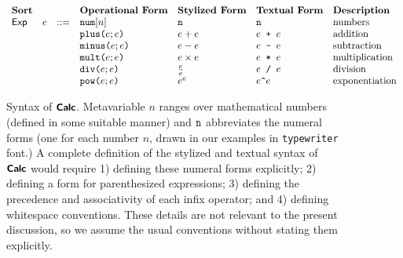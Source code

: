 \begin{figure}
\hspace{-5px}$\begin{array}{lrlllll}
\textbf{Sort} & & & \textbf{Operational Form} & \textbf{Stylized Form} & \textbf{Textual Form} & \textbf{Description}\\
\mathsf{Exp} & e & ::= & \anumintro{n} & \numintro{n} & \numintro{n} & \text{numbers}\\
&&& \aplus{e}{e} & e + e & e\texttt{ + }e & \text{addition} \\
&&& \aminus{e}{e} & e - e & e\texttt{ - }e & \text{subtraction}\\
&&& \amult{e}{e} & e \times e & e\texttt{ * }e & \text{multiplication}\\
&&& \adiv{e}{e} & \frac{e}{e} & e\texttt{ / }e & \text{division}\\
&&& \apow{e}{e} & {e}^{e} & e\verb|^|e & \text{exponentiation}
\end{array}$
\caption[Syntax of $\simplelang$]{Syntax of $\simplelang$. Metavariable $n$ ranges over mathematical numbers (defined in some suitable manner) and $\texttt{n}$ abbreviates the numeral forms (one for each number $n$, drawn in our examples in \texttt{typewriter} font.) A complete definition of the stylized and textual syntax of $\simplelang$ would require 1) defining these numeral forms explicitly; 2) defining a form for parenthesized expressions; 3) defining the precedence and associativity of each infix operator; and 4) defining whitespace conventions. These details are not relevant to the present discussion, so we assume the usual conventions without stating them explicitly.}
\label{fig:simple-example}
\end{figure}

